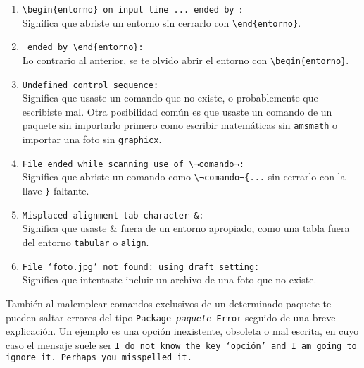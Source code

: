 \begin{enumerate}
	\item \verb|\begin{entorno} on input line ... ended by |: \\
		Significa que abriste un entorno sin cerrarlo con \verb|\end{entorno}|.

	\item \verb| ended by \end{entorno}:| \\
		Lo contrario al anterior, se te olvido abrir el entorno con \verb|\begin{entorno}|.

	\item \texttt{Undefined control sequence:} \\
		Significa que usaste un comando que no existe, o probablemente que escribiste mal.
		Otra posibilidad común es que usaste un comando de un paquete sin importarlo primero como escribir matemáticas sin \texttt{amsmath}
		o importar una foto sin \texttt{graphicx}. 

	\item \texttt{File ended while scanning use of \lstinline|\¬comando¬|:} \\
		Significa que abriste un comando como \lstinline|\¬comando¬{...| sin cerrarlo con la llave \lstinline|}| faltante.

	\item \texttt{Misplaced alignment tab character \&:} \\
		Significa que usaste \& fuera de un entorno apropiado, como una tabla fuera del entorno \texttt{tabular} o \texttt{align}.

	\item \texttt{File `\textit{foto.jpg}' not found: using draft setting:} \\
		Significa que intentaste incluir un archivo de una foto que no existe.
\end{enumerate}

También al malemplear comandos exclusivos de un determinado paquete te pueden saltar errores del tipo \texttt{Package
\textit{paquete} Error}
seguido de una breve explicación.
Un ejemplo es una opción inexistente, obsoleta o mal escrita, en cuyo caso el mensaje suele ser \texttt{I do not know
the key `\textit{opción}' and I am going to ignore it. Perhaps you misspelled it.}
